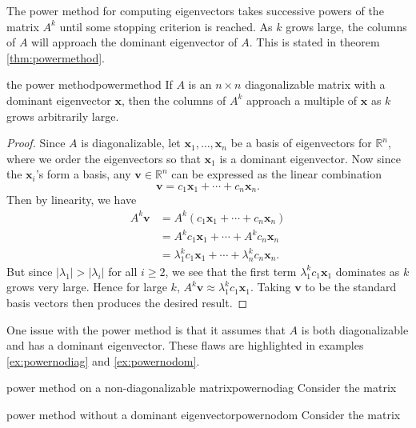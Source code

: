 \documentclass{article}
\let\vec\mathbf
\begin{document}
The power method for computing eigenvectors takes successive powers of the matrix $A^k$ until some stopping criterion is reached. As $k$ grows large, the columns of $A$ will approach the dominant eigenvector of $A$. This is stated in theorem \ref{thm:powermethod}.

\begin{theorem}{the power method}{powermethod}
  If $A$ is an $n \times n$ diagonalizable matrix with a dominant eigenvector $\vec{x}$, then the columns of $A^k$ approach a multiple of $\vec{x}$ as $k$ grows arbitrarily large.
\end{theorem}
\begin{proof}
  Since $A$ is diagonalizable, let $\vec{x}_1, \ldots, \vec{x}_n$ be a basis of eigenvectors for $\mathbb{R}^n$, where we order the eigenvectors so that $\vec{x}_1$ is a dominant eigenvector. Now since the $\vec{x}_i$'s form a basis, any $\vec{v} \in \mathbb{R}^n$ can be expressed as the linear combination
  \begin{equation*}
    \vec{v} = c_1\vec{x}_1 + \cdots + c_n\vec{x}_n.
  \end{equation*}
  Then by linearity, we have
  \begin{align*}
    A^k\vec{v} &= A^k(c_1\vec{x}_1 + \cdots + c_n\vec{x}_n) \\
               &= A^kc_1\vec{x}_1 + \cdots + A^kc_n\vec{x}_n \\
               &= \lambda_1^kc_1\vec{x}_1 + \cdots + \lambda_n^kc_n\vec{x}_n.
  \end{align*}
  But since $|\lambda_1| > |\lambda_i|$ for all $i \geq 2$, we see that the first term $\lambda_1^kc_1\vec{x}_1$ dominates as $k$ grows very large. Hence for large $k$, $A^k\vec{v} \approx \lambda_1^kc_1\vec{x}_1$. Taking $\vec{v}$ to be the standard basis vectors then produces the desired result.
\end{proof}

One issue with the power method is that it assumes that $A$ is both diagonalizable and has a dominant eigenvector. These flaws are highlighted in examples \ref{ex:powernodiag} and \ref{ex:powernodom}.

\begin{example}{power method on a non-diagonalizable matrix}{powernodiag}
  Consider the matrix
\end{example}

\begin{example}{power method without a dominant eigenvector}{powernodom}
  Consider the matrix
\end{example}
\end{document}
